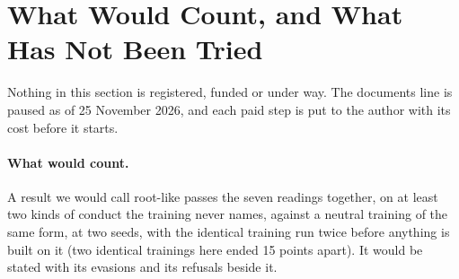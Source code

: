 \documentclass[11pt]{article}
\begin{document}
\section{What Would Count, and What Has Not Been Tried}\label{sec:agenda}

Nothing in this section is registered, funded or under way. The documents line is paused as of 25 November 2026, and each paid step is put to the author with its cost before it starts.

\paragraph{What would count.} A result we would call root-like passes the seven readings together, on at least two kinds of conduct the training never names, against a neutral training of the same form, at two seeds, with the identical training run twice before anything is built on it (two identical trainings here ended 15 points apart). It would be stated with its evasions and its refusals beside it.
\end{document}
